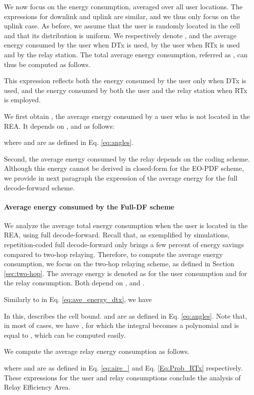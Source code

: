 \documentclass[journal]{IEEEtran}
\theoremstyle{definition}
\begin{document}
We now focus on the energy consumption, averaged over all user locations. 
The expressions for downlink and uplink are similar, and we thus only focus on the uplink case.
As before, we assume that the user is randomly located in the cell and that its distribution is uniform.
We respectively denote ,  and  the average energy consumed by the user when DTx is used, by the user when RTx is used and by the relay station. The total average energy consumption, referred as , can thus be computed as follows. 

This expression reflects both the energy consumed by the user only when DTx is used, and the energy consumed by both the user and the relay station when RTx is employed.


We first obtain , the average energy consumed by a user who is not located in the REA. It depends on ,  and  as follows:

where  and  are as defined in Eq. \eqref{eq:angles}.

Second, the average energy consumed by the relay depends on the coding scheme. Although this energy cannot be derived in closed-form for the EO-PDF scheme, we provide in next paragraph the expression of the average energy for the full decode-forward scheme.

\paragraph*{Average energy consumed by the Full-DF scheme}

We analyze the average total energy consumption when the user is located in the REA, using full decode-forward. Recall that, as exemplified by simulations, repetition-coded full decode-forward only brings a few percent of energy savings compared to two-hop relaying. Therefore, to compute the average energy consumption, we focus on the two-hop relaying scheme, as defined in Section \ref{sec:two-hop}.
The average energy is denoted as  for the user consumption and  for the relay consumption. Both depend on ,  and .

Similarly to  in Eq. \eqref{eq:ave_energy_dtx}, we have 

In this,  describes the cell bound.  and  are as defined in Eq. \eqref{eq:angles}.
Note that, in most of cases, we have , for which the integral  becomes a polynomial and is equal to , which can be computed easily.

We compute the average relay energy consumption  as follows. 

where  and  are as defined in Eq. \eqref{eq:aire_} and Eq. \eqref{Eq:Prob_RTx} respectively.
These expressions for the user and relay consumptions conclude the analysis of Relay Efficiency Area.
\end{document}
